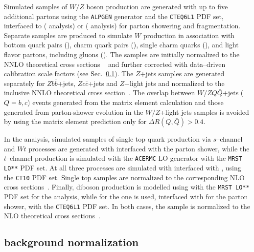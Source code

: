 Simulated samples of $W/Z$ boson production are generated with up to
five additional partons using the {\tt ALPGEN} generator and the
{\tt CTEQ6L1} PDF set, interfaced to \herwig{} (\seventev{} analysis) or
\pythia{} (\eighttev{} analysis) for parton showering and fragmentation. 
Separate samples are produced to simulate $W$ production in
association with bottom quark pairs (\wbb{}), charm quark
pairs (\wcc{}), single charm quarks (\wc{}), and light
flavor partons, including gluons (\wlight{}). The samples are initially
normalized to the NNLO theoretical cross sections ~\cite{vjetsxs} and
further corrected with data--driven calibration scale factors
(see Sec.~\ref{sec:wjets}).
The $Z$+jets samples are generated separately for $Zb\bar{b}$+jets,
$Zc\bar{c}$+jets and $Z$+light jets and normalized to the inclusive
NNLO theoretical cross section~\cite{vjetsxs}.
The overlap between $W/ZQ\bar{Q}$+jets ($Q=b,c$) events generated from the
matrix element calculation and those generated from parton-shower
evolution in the $W/Z$+light jets samples is avoided by using the
matrix element prediction only for $\Delta R(Q,\bar{Q})>0.4$.

In the \seventev{} analysis, simulated samples of single top quark
production via $s$--channel and $Wt$ processes are generated with
\mcatnlo{} interfaced with the \herwig{} parton shower, while the
$t$--channel production is simulated with the {\tt ACERMC} LO
generator with the {\tt MRST LO**} PDF set.
At \eighttev{} all three processes are simulated with \powheg{}
interfaced with \pythia{}, using the {\tt CT10} PDF set.
Single top samples are normalized to the corresponding NLO cross
sections~\cite{stschan,sttchan,stwt}. 
Finally, diboson production is modelled using \herwig{} with
the {\tt MRST LO**} PDF set for the \seventev{} analysis, while for
the \eighttev{} one \alpgen{} is used, interfaced with \herwig{} for
the parton shower, with the {\tt CTEQ6L1} PDF set. In both cases, the
sample is normalized to the NLO theoretical cross
sections~\cite{dibosonxs}.

\subsection{\wjets{} background normalization}
\label{sec:wjets}

